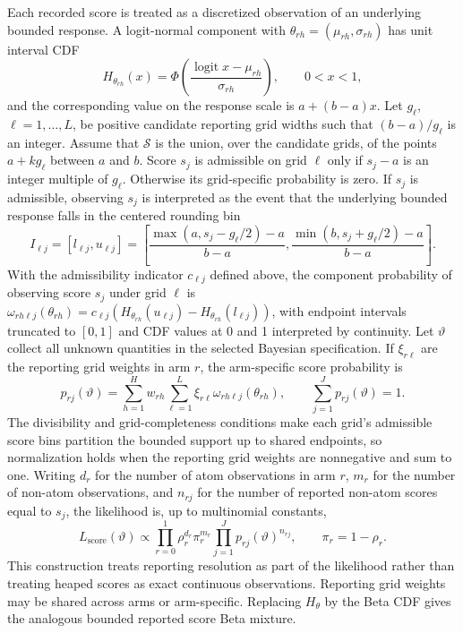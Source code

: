 \documentclass[11pt]{article}
\DeclareMathOperator{\logit}{logit}
\begin{document}
Each recorded score is treated as a discretized observation of an underlying
bounded response. A logit-normal component with
$\theta_{rh}=(\mu_{rh},\sigma_{rh})$ has unit interval CDF
\[
  H_{\theta_{rh}}(x)
  =
  \Phi\left(\frac{\logit x-\mu_{rh}}{\sigma_{rh}}\right),
  \qquad 0<x<1,
\]
and the corresponding value on the response scale is $a+(b-a)x$. Let $g_\ell$, $\ell=1,\ldots,L$, be
positive candidate reporting grid widths such that $(b-a)/g_\ell$ is an integer. Assume that $\mathcal{S}$ is the union, over the candidate grids, of the points $a+kg_\ell$ between $a$ and $b$. Score $s_j$ is admissible on grid $\ell$ only
if $s_j-a$ is an integer multiple of $g_\ell$. Otherwise its grid-specific
probability is zero. If $s_j$ is admissible, observing $s_j$ is interpreted as
the event that the underlying bounded response falls in the centered rounding
bin
\[
  I_{\ell j}
  =
  [l_{\ell j},u_{\ell j}]
  =
  \left[
    \frac{\max(a,s_j-g_\ell/2)-a}{b-a},
    \frac{\min(b,s_j+g_\ell/2)-a}{b-a}
  \right].
\]
With the admissibility indicator $c_{\ell j}$ defined above, the component probability of observing score $s_j$ under grid
$\ell$ is
$\omega_{rh\ell j}(\theta_{rh}) =
c_{\ell j}(H_{\theta_{rh}}(u_{\ell j}) - H_{\theta_{rh}}(l_{\ell j}))$, with
endpoint intervals truncated to $[0,1]$ and CDF values at 0 and 1 interpreted by
continuity. Let $\vartheta$ collect all unknown quantities in the selected Bayesian specification. If $\xi_{r\ell}$ are the reporting grid weights in arm $r$, the arm-specific
score probability is
\[
  p_{rj}(\vartheta)
  =
  \sum_{h=1}^{H} w_{rh}
  \sum_{\ell=1}^{L}\xi_{r\ell} \omega_{rh\ell j}(\theta_{rh}),
  \qquad
  \sum_{j=1}^{J}p_{rj}(\vartheta)=1.
\]
The divisibility and grid-completeness conditions make each grid's admissible score bins partition the
bounded support up to shared endpoints, so normalization holds when the reporting grid weights are nonnegative and
sum to one. Writing $d_r$ for the number of atom observations in arm $r$, $m_r$
for the number of non-atom observations, and $n_{rj}$ for the number of reported
non-atom scores equal to $s_j$, the likelihood is, up to multinomial constants,
\[
  L_{\mathrm{score}}(\vartheta)
  \propto
  \prod_{r=0}^{1}
  \rho_r^{d_r}\pi_r^{m_r}
  \prod_{j=1}^{J}
  p_{rj}(\vartheta)^{n_{rj}},
  \qquad
  \pi_r=1-\rho_r.
\]
This construction treats reporting resolution as part of the likelihood rather
than treating heaped scores as exact continuous observations. Reporting grid weights may be
shared across arms or arm-specific. Replacing $H_\theta$ by the Beta CDF gives
the analogous bounded reported score Beta mixture.
\end{document}
